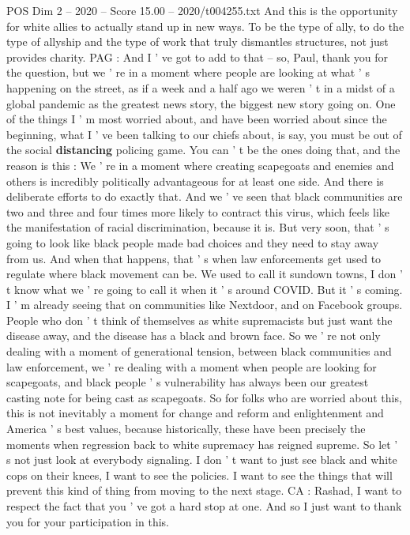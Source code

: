 \begin{textsample}{POS Dim 2 – 2020 – Score 15.00 – 2020/t004255.txt}
And this is the opportunity for white allies to actually stand up in new ways.
To be the type of ally, to do the type of allyship and the type of work that truly dismantles structures, not just provides charity.
PAG : And I ' ve got to add to that -- so, Paul, thank you for the question, but we ' re in a moment where people are looking at what ' s happening on the street, as if a week and a half ago we weren ' t in a midst of a global pandemic as the greatest news story, the biggest new story going on.
One of the things I ' m most worried about, and have been worried about since the beginning, what I ' ve been talking to our chiefs about, is say, you must be out of the social \textbf{distancing} policing game.
You can ' t be the ones doing that, and the reason is this : We ' re in a moment where creating scapegoats and enemies and others is incredibly politically advantageous for at least one side.
And there is deliberate efforts to do exactly that.
And we ' ve seen that black communities are two and three and four times more likely to contract this virus, which feels like the manifestation of racial discrimination, because it is.
But very soon, that ' s going to look like black people made bad choices and they need to stay away from us.
And when that happens, that ' s when law enforcements get used to regulate where black movement can be.
We used to call it sundown towns, I don ' t know what we ' re going to call it when it ' s around COVID.
But it ' s coming.
I ' m already seeing that on communities like Nextdoor, and on Facebook groups.
People who don ' t think of themselves as white supremacists but just want the disease away, and the disease has a black and brown face.
So we ' re not only dealing with a moment of generational tension, between black communities and law enforcement, we ' re dealing with a moment when people are looking for scapegoats, and black people ' s vulnerability has always been our greatest casting note for being cast as scapegoats.
So for folks who are worried about this, this is not inevitably a moment for change and reform and enlightenment and America ' s best values, because historically, these have been precisely the moments when regression back to white supremacy has reigned supreme.
So let ' s not just look at everybody signaling.
I don ' t want to just see black and white cops on their knees, I want to see the policies.
I want to see the things that will prevent this kind of thing from moving to the next stage.
CA : Rashad, I want to respect the fact that you ' ve got a hard stop at one.
And so I just want to thank you for your participation in this.

\end{textsample}
